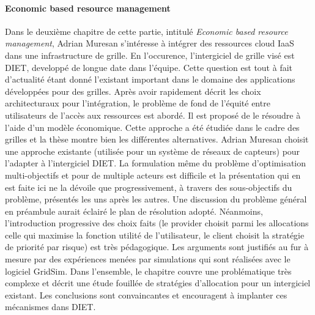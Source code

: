 \documentclass[a4paper,12pt]{article}
\begin{document}
   
\paragraph{Economic based  resource management}
\vspace{-3mm}
Dans  le deuxième  chapitre  de cette  partie,  intitulé \textit{Economic  based
  resource  management}, Adrian  Muresan s'intéresse  à intégrer  des ressources
cloud IaaS dans  une infrastructure de grille. En  l'occurence, l'intergiciel de
grille visé est DIET, developpé de longue date dans l'équipe. Cette question est
tout à  fait d'actualité étant  donné l'existant  important dans le  domaine des
applications développées  pour des grilles.   Après avoir rapidement  décrit les
choix architecturaux pour  l'intégration, le problème de fond  de l'équité entre
utilisateurs de l'accès aux ressources est abordé. Il est proposé de le résoudre
à l'aide d'un modèle économique. Cette approche  a été étudiée dans le cadre des
grilles et  la thèse montre  bien les différentes alternatives.   Adrian Muresan
choisit une approche existante (utilisée pour un système de réseaux de capteurs)
pour  l'adapter  à   l'intergiciel  DIET.   La  formulation   même  du  problème
d'optimisation multi-objectifs et  pour de multiple acteurs est  difficile et la
présentation qui en  est faite ici ne la dévoile  que progressivement, à travers
des  sous-objectifs  du problème,  présentés  les  uns  après les  autres.   Une
discussion du problème général en préambule aurait éclairé le plan de résolution
adopté.   Néanmoins, l'introduction  progressive  des choix  faits (le  provider
choisit  parmi  les  allocations  celle  qui maximise  la  fonction  utilité  de
l'utilisateur, le client  choisit la stratégie de priorité par  risque) est très
pédagogique.  Les arguments  sont justifiés au fur à mesure  par des expériences
menées  par simulations  qui  sont  réalisées avec  le  logiciel GridSim.   Dans
l'ensemble, le  chapitre couvre  une problématique très  complexe et  décrit une
étude fouillée  de stratégies  d'allocation pour  un intergiciel  existant.  Les
conclusions sont  convaincantes et encouragent  à implanter ces  mécanismes dans
DIET.
\end{document}
